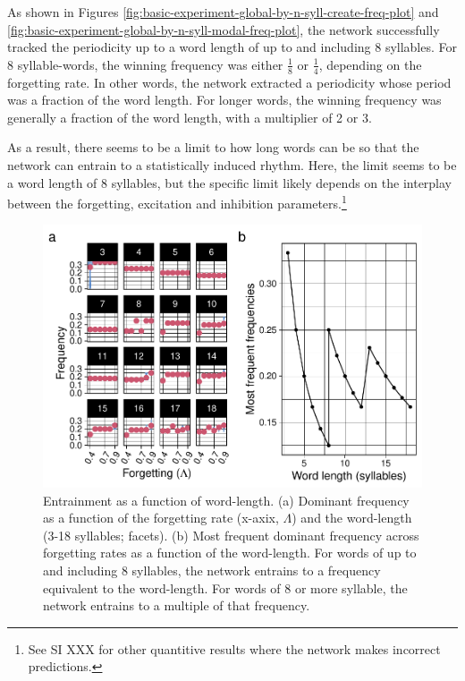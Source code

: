 \documentclass[
]{article}
\begin{document}
As shown in Figures
\ref{fig:basic-experiment-global-by-n-syll-create-freq-plot} and
\ref{fig:basic-experiment-global-by-n-syll-modal-freq-plot}, the network
successfully tracked the periodicity up to a word length of up to and
including 8 syllables. For 8 syllable-words, the winning frequency was
either \(\frac{1}{8}\) or \(\frac{1}{4}\), depending on the forgetting
rate. In other words, the network extracted a periodicity whose period
was a fraction of the word length. For longer words, the winning
frequency was generally a fraction of the word length, with a multiplier
of 2 or 3.

As a result, there seems to be a limit to how long words can be so that
the network can entrain to a statistically induced rhythm. Here, the
limit seems to be a word length of 8 syllables, but the specific limit
likely depends on the interplay between the forgetting, excitation and
inhibition parameters.\footnote{See SI XXX for other quantitive results
  where the network makes incorrect predictions.}

\begin{figure}
\includegraphics[width=1\linewidth]{tp_model_entrainment_files/figure-latex/basic-experiment-global-by-n-syll-create-freq-plot-plot-1} \caption{Entrainment as a function of word-length. (a) Dominant frequency as a function of the forgetting rate (x-axix, $\Lambda$) and the word-length (3-18 syllables; facets). (b) Most frequent dominant frequency across forgetting rates as a function of the word-length. For words of up to and including 8 syllables, the network entrains to a frequency equivalent to the word-length. For words of 8 or more syllable, the network entrains to a multiple of that frequency.}\label{fig:basic-experiment-global-by-n-syll-create-freq-plot-plot}
\end{figure}
\end{document}
